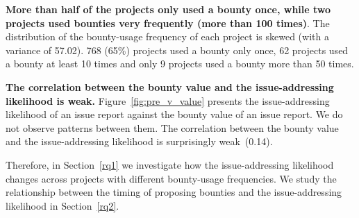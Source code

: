 \textbf{More than half of the projects only used a bounty once, while two projects used bounties very frequently (more than 100 times)}. The distribution of the bounty-usage frequency of each project is skewed (with a variance of 57.02). 768 (65\%) projects used a bounty only once, 62 projects used a bounty at least 10 times and only 9 projects used a bounty more than 50 times.





\textbf{The correlation between the bounty value and the issue-addressing likelihood is weak.} Figure~\ref{fig:pre_v_value} presents the issue-addressing likelihood of an issue report against the bounty value of an issue report. We do not observe patterns between them. The correlation between the bounty value and the issue-addressing likelihood is surprisingly weak~(0.14).

Therefore, in Section~\ref{rq1} we investigate how the issue-addressing likelihood changes across projects with different bounty-usage frequencies. We study the relationship between the timing of proposing bounties and the issue-addressing likelihood in Section~\ref{rq2}.

